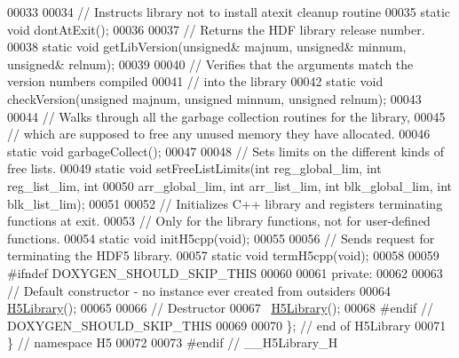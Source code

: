 \begin{DoxyCode}
00033 
00034         \textcolor{comment}{// Instructs library not to install atexit cleanup routine}
00035         \textcolor{keyword}{static} \textcolor{keywordtype}{void} dontAtExit();
00036 
00037         \textcolor{comment}{// Returns the HDF library release number.}
00038         \textcolor{keyword}{static} \textcolor{keywordtype}{void} getLibVersion(\textcolor{keywordtype}{unsigned}& majnum, \textcolor{keywordtype}{unsigned}& minnum, \textcolor{keywordtype}{unsigned}& relnum);
00039 
00040         \textcolor{comment}{// Verifies that the arguments match the version numbers compiled}
00041         \textcolor{comment}{// into the library}
00042         \textcolor{keyword}{static} \textcolor{keywordtype}{void} checkVersion(\textcolor{keywordtype}{unsigned} majnum, \textcolor{keywordtype}{unsigned} minnum, \textcolor{keywordtype}{unsigned} relnum);
00043 
00044         \textcolor{comment}{// Walks through all the garbage collection routines for the library,}
00045         \textcolor{comment}{// which are supposed to free any unused memory they have allocated.}
00046         \textcolor{keyword}{static} \textcolor{keywordtype}{void} garbageCollect();
00047 
00048         \textcolor{comment}{// Sets limits on the different kinds of free lists.}
00049         \textcolor{keyword}{static} \textcolor{keywordtype}{void} setFreeListLimits(\textcolor{keywordtype}{int} reg\_global\_lim, \textcolor{keywordtype}{int} reg\_list\_lim, \textcolor{keywordtype}{int}
00050         arr\_global\_lim, \textcolor{keywordtype}{int} arr\_list\_lim, \textcolor{keywordtype}{int} blk\_global\_lim, \textcolor{keywordtype}{int} blk\_list\_lim);
00051 
00052         \textcolor{comment}{// Initializes C++ library and registers terminating functions at exit.}
00053         \textcolor{comment}{// Only for the library functions, not for user-defined functions.}
00054         \textcolor{keyword}{static} \textcolor{keywordtype}{void} initH5cpp(\textcolor{keywordtype}{void});
00055 
00056         \textcolor{comment}{// Sends request for terminating the HDF5 library.}
00057         \textcolor{keyword}{static} \textcolor{keywordtype}{void} termH5cpp(\textcolor{keywordtype}{void});
00058 
00059 \textcolor{preprocessor}{#ifndef DOXYGEN\_SHOULD\_SKIP\_THIS}
00060 
00061    \textcolor{keyword}{private}:
00062 
00063         \textcolor{comment}{// Default constructor - no instance ever created from outsiders}
00064         \hyperlink{class_h5_1_1_h5_library}{H5Library}();
00065 
00066         \textcolor{comment}{// Destructor}
00067         ~\hyperlink{class_h5_1_1_h5_library}{H5Library}();
00068 \textcolor{preprocessor}{#endif // DOXYGEN\_SHOULD\_SKIP\_THIS}
00069 
00070 \}; \textcolor{comment}{// end of H5Library}
00071 \} \textcolor{comment}{// namespace H5}
00072 
00073 \textcolor{preprocessor}{#endif // \_\_H5Library\_H}
\end{DoxyCode}
